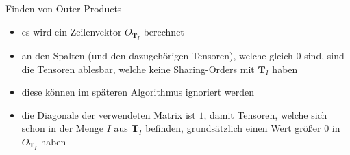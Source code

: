 \documentclass{beamer}
\begin{document}
\begin{frame}{Finden von Outer-Products}
	\begin{itemize}
		\item es wird ein Zeilenvektor $O_{\bm{T}_I}$ berechnet
		\item an den Spalten (und den dazugehörigen Tensoren), welche gleich $0$ sind, sind die Tensoren ablesbar, welche keine Sharing-Orders mit $\bm{T}_I$ haben
		\item diese können im späteren Algorithmus ignoriert werden \pause
		\item die Diagonale der verwendeten Matrix ist $1$, damit Tensoren, welche sich schon in der Menge $I$ aus $\bm{T}_I$ befinden, grundsätzlich einen Wert größer $0$ in $O_{\bm{T}_I}$ haben
	\end{itemize}
\end{frame}
\end{document}
